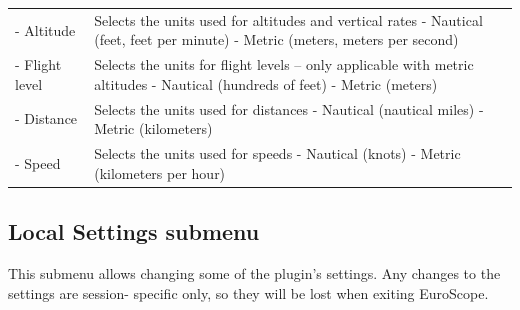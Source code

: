 \documentclass[11pt,a4paper,oldfontcommands]{memoir}
\begin{document}
\begin{tabular}{p{5cm}p{10cm}}
    \\- Altitude & Selects the units used for altitudes and vertical rates
    - Nautical (feet, feet per minute)
    - Metric (meters, meters per second)
    \\- Flight level & Selects the units for flight levels – only applicable with metric altitudes
    - Nautical (hundreds of feet)
    - Metric (meters)
    \\- Distance & Selects the units used for distances
    - Nautical (nautical miles)
    - Metric (kilometers)
    \\- Speed & Selects the units used for speeds
    - Nautical (knots)
    - Metric (kilometers per hour)
\end{tabular}

\subsection*{Local Settings submenu}
This submenu allows changing some of the plugin’s settings. Any changes to the settings are session-
specific only, so they will be lost when exiting EuroScope.
\medskip
\end{document}
